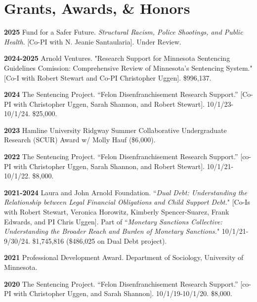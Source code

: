 \documentclass[letterpaper]{article}
\newenvironment{publist}{%
  \begin{list}{}{%
    \setlength{\leftmargin}{0cm}   %
    \setlength{\labelwidth}{2cm}     %
    \setlength{\labelsep}{0.5cm}     %
  }%
}{%
  \end{list}%
}
\begin{document}
\section*{\textbf{Grants, Awards, \& Honors}}

\begin{publist}

\item[\textbf{2025}] Fund for a Safer Future. \textit{Structural Racism, Police Shootings, and Public Health}. [Co-PI with N. Jeanie Santaularia]. Under Review.  

\item[\textbf{2024-2025}] Arnold Ventures. "Research Support for Minnesota Sentencing Guidelines Comission: Comprehensive Review of Minnesota's Sentencing System." [Co-I with Robert Stewart and Co-PI Christopher Uggen]. \$996,137. 

\item[\textbf{2024}] The Sentencing Project. “Felon Disenfranchisement Research Support.” [Co-PI with Christopher Uggen, Sarah Shannon, and Robert Stewart]. 10/1/23-10/1/24. \$25,000.

\item[\textbf{2023}] Hamline University Ridgway Summer Collaborative Undergraduate Research (SCUR) Award w/ Molly Hauf (\$6,000).

\item[\textbf{2022}]The Sentencing Project. “Felon Disenfranchisement Research Support.” [co-PI with Christopher Uggen, Sarah Shannon, and Robert Stewart]. 10/1/21-10/1/22. \$8,000.

\item[\textbf{2021-2024}]  Laura and John Arnold Foundation. ``\textit{Dual Debt: Understanding the Relationship between Legal Financial Obligations and Child Support Debt.}" [Co-Is with Robert Stewart, Veronica Horowitz, Kimberly Spencer-Suarez, Frank Edwards, and PI Chris Uggen]. Part of ``\textit{Monetary Sanctions Collective: Understanding the Broader Reach and Burden of Monetary Sanctions.}" 10/1/21-9/30/24. \$1,745,816 (\$486,025 on Dual Debt project).

\item[\textbf{2021}] Professional Development Award. Department of Sociology, University of Minnesota. 

\item[\textbf{2020}] The Sentencing Project. “Felon Disenfranchisement Research Support.” [co-PI with Christopher Uggen, and Sarah Shannon]. 10/1/19-10/1/20. \$8,000.


\end{publist}
\end{document}

